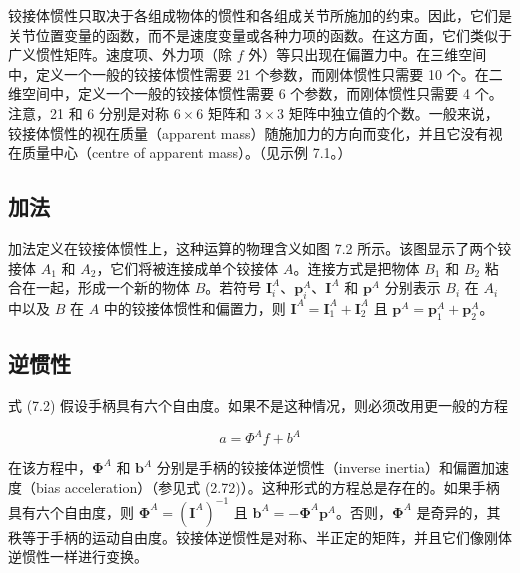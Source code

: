 \documentclass[10pt,a4paper]{book}
\theoremstyle{thmstyle} %
\theoremstyle{defstyle} %
\theoremstyle{prostyle} %
\begin{document}
铰接体惯性只取决于各组成物体的惯性和各组成关节所施加的约束。因此，它们是关节位置变量的函数，而不是速度变量或各种力项的函数。在这方面，它们类似于广义惯性矩阵。速度项、外力项（除 $f$ 外）等只出现在偏置力中。在三维空间中，定义一个一般的铰接体惯性需要 21 个参数，而刚体惯性只需要 10 个。在二维空间中，定义一个一般的铰接体惯性需要 6 个参数，而刚体惯性只需要 4 个。注意，21 和 6 分别是对称 $6 \times 6$ 矩阵和 $3 \times 3$ 矩阵中独立值的个数。一般来说，铰接体惯性的视在质量（apparent mass）随施加力的方向而变化，并且它没有视在质量中心（centre of apparent mass）。（见示例 7.1。）



\subsection{加法}





加法定义在铰接体惯性上，这种运算的物理含义如图 7.2 所示。该图显示了两个铰接体 $A_{1}$ 和 $A_{2}$，它们将被连接成单个铰接体 $A$。连接方式是把物体 $B_{1}$ 和 $B_{2}$ 粘合在一起，形成一个新的物体 $B$。若符号 $\boldsymbol{I}_{i}^{A}$、$\boldsymbol{p}_{i}^{A}$、$\boldsymbol{I}^{A}$ 和 $\boldsymbol{p}^{A}$ 分别表示 $B_{i}$ 在 $A_{i}$ 中以及 $B$ 在 $A$ 中的铰接体惯性和偏置力，则 $\boldsymbol{I}^{A}=\boldsymbol{I}_{1}^{A}+\boldsymbol{I}_{2}^{A}$ 且 $\boldsymbol{p}^{A}=\boldsymbol{p}_{1}^{A}+\boldsymbol{p}_{2}^{A}$。



\subsection{逆惯性}





式 (7.2) 假设手柄具有六个自由度。如果不是这种情况，则必须改用更一般的方程



$$
a = \Phi^{A} f + b^{A}
$$



在该方程中，$\boldsymbol{\Phi}^{A}$ 和 $\boldsymbol{b}^{A}$ 分别是手柄的铰接体逆惯性（inverse inertia）和偏置加速度（bias acceleration）（参见式 (2.72)）。这种形式的方程总是存在的。如果手柄具有六个自由度，则 $\boldsymbol{\Phi}^{A}=(\boldsymbol{I}^{A})^{-1}$ 且 $\boldsymbol{b}^{A}=-\boldsymbol{\Phi}^{A}\boldsymbol{p}^{A}$。否则，$\boldsymbol{\Phi}^{A}$ 是奇异的，其秩等于手柄的运动自由度。铰接体逆惯性是对称、半正定的矩阵，并且它们像刚体逆惯性一样进行变换。
\end{document}
